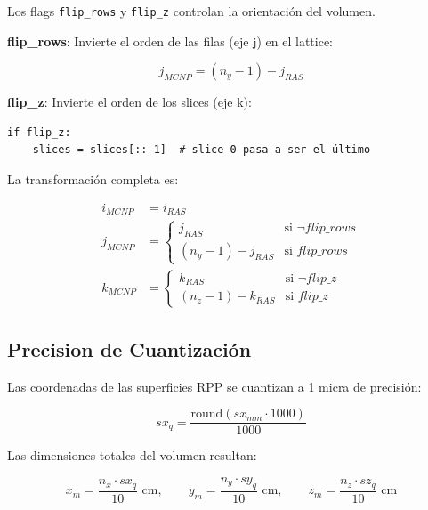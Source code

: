 \documentclass[12pt,a4paper]{article}
\begin{document}
Los flags \texttt{flip\_rows} y \texttt{flip\_z} controlan la orientación del volumen.

\textbf{flip\_rows}: Invierte el orden de las filas (eje j) en el lattice:

$$
j_{MCNP} = (n_y - 1) - j_{RAS}
$$


\textbf{flip\_z}: Invierte el orden de los slices (eje k):

\begin{lstlisting}
if flip_z:
    slices = slices[::-1]  # slice 0 pasa a ser el último
\end{lstlisting}

La transformación completa es:

$$
\begin{aligned}
i_{MCNP} &= i_{RAS} \\
j_{MCNP} &= \begin{cases}
j_{RAS} & \text{si } \neg flip\_rows \\
(n_y - 1) - j_{RAS} & \text{si } flip\_rows
\end{cases} \\
k_{MCNP} &= \begin{cases}
k_{RAS} & \text{si } \neg flip\_z \\
(n_z - 1) - k_{RAS} & \text{si } flip\_z
\end{cases}
\end{aligned}
$$


\subsection{Precision de Cuantización}

Las coordenadas de las superficies RPP se cuantizan a 1 micra de precisión:

$$
sx_q = \frac{\text{round}(sx_{mm} \cdot 1000)}{1000}
$$


Las dimensiones totales del volumen resultan:

$$
x_m = \frac{n_x \cdot sx_q}{10}\text{ cm},\qquad
y_m = \frac{n_y \cdot sy_q}{10}\text{ cm},\qquad
z_m = \frac{n_z \cdot sz_q}{10}\text{ cm}
$$
\end{document}
